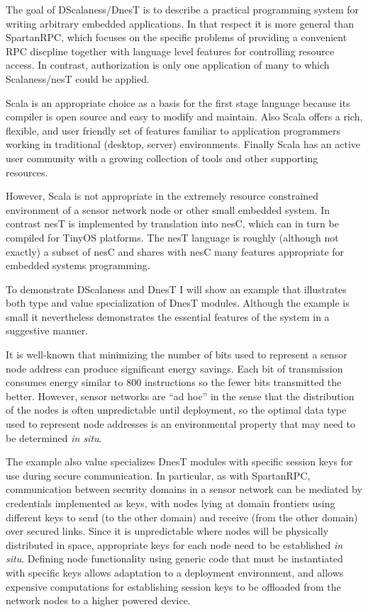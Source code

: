 The goal of DScalaness/DnesT is to describe a practical programming system for writing arbitrary
embedded applications. In that respect it is more general than SpartanRPC, which focuses on the
specific problems of providing a convenient RPC discpline together with language level features
for controlling resource access. In contrast, authorization is only one application of many to
which Scalaness/nesT could be applied.

Scala is an appropriate choice as a basis for the first stage language because its compiler is
open source and easy to modify and maintain. Also Scala offers a rich, flexible, and user
friendly set of features familiar to application programmers working in traditional (desktop,
server) environments. Finally Scala has an active user community with a growing collection of
tools and other supporting resources.

However, Scala is not appropriate in the extremely resource constrained environment of a sensor
network node or other small embedded system. In contrast nesT is implemented by translation into
nesC, which can in turn be compiled for TinyOS platforms. The nesT language is roughly (although
not exactly) a subset of nesC and shares with nesC many features appropriate for embedded
systems programming.

To demonstrate DScalaness and DnesT I will show an example that illustrates both type and value
specialization of DnesT modules. Although the example is small it nevertheless demonstrates the
essential features of the system in a suggestive manner.

It is well-known that minimizing the number of bits used to represent a sensor node address can
produce significant energy savings. Each bit of transmission consumes energy similar to 800
instructions \cite{tag} so the fewer bits transmitted the better. However, sensor networks are
``ad hoc'' in the sense that the distribution of the nodes is often unpredictable until
deployment, so the optimal data type used to represent node addresses is an environmental
property that may need to be determined \emph{in situ}.

The example also value specializes DnesT modules with specific session keys for use during
secure communication. In particular, as with SpartanRPC, communication between security domains
in a sensor network can be mediated by credentials implemented as keys, with nodes lying at
domain frontiers using different keys to send (to the other domain) and receive (from the other
domain) over secured links. Since it is unpredictable where nodes will be physically distributed
in space, appropriate keys for each node need to be established \emph{in situ}. Defining node
functionality using generic code that must be instantiated with specific keys allows adaptation
to a deployment environment, and allows expensive computations for establishing session keys to
be offloaded from the network nodes to a higher powered device.

